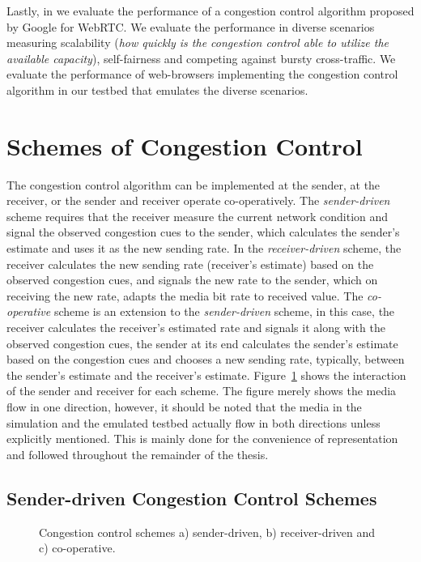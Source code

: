 Lastly, in  we evaluate the performance of a congestion
control algorithm proposed by Google for WebRTC. We evaluate the performance
in diverse scenarios measuring scalability (\emph{how quickly is the
congestion control able to utilize the available capacity}), self-fairness and
competing against bursty cross-traffic. We evaluate the performance of
web-browsers implementing the congestion control algorithm in our testbed that
emulates the diverse scenarios.

\section{Schemes of Congestion Control}

The congestion control algorithm can be implemented at the sender, at the
receiver, or the sender and receiver operate co-operatively. The
\emph{sender-driven} scheme requires that the receiver measure the current
network condition and signal the observed congestion cues to the sender, which
calculates the sender's estimate and uses it as the new sending rate. In the
\emph{receiver-driven} scheme, the receiver calculates the new sending rate
(receiver's estimate) based on the observed congestion cues, and signals the
new rate to the sender, which on receiving the new rate, adapts the media bit
rate to received value. The \emph{co-operative} scheme is an extension to the
\emph{sender-driven} scheme, in this case, the receiver calculates the
receiver's estimated rate and signals it along with the observed congestion
cues, the sender at its end calculates the sender's estimate based on the
congestion cues and chooses a new sending rate, typically, between the
sender's estimate and the receiver's estimate. Figure~\ref{fig:cc:scheme}
shows the interaction of the sender and receiver for each scheme. The figure
merely shows the media flow in one direction, however, it should be noted that
the media in the simulation and the emulated testbed actually flow in both
directions unless explicitly mentioned. This is mainly done for the
convenience of representation and followed throughout the remainder of the
thesis.

\subsection{Sender-driven Congestion Control Schemes}

\begin{figure}[!t]
  \centerline{
  }
  \centerline{
  }
  \centerline{
  }
  \caption{Congestion control schemes a) sender-driven, b) receiver-driven
and c) co-operative.}
  \label{fig:cc:scheme}
\end{figure}


